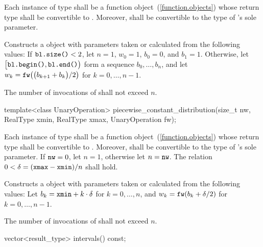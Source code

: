 \begin{itemdescr}
\pnum\requires
 Each instance of type 
 shall be a function object~(\ref{function.objects})
 whose return type shall be convertible to .
 Moreover,
  shall be convertible
 to the type of 's sole parameter.

\pnum\effects Constructs a  object
 with parameters taken or calculated
 from the following values:
 If $\texttt{bl.size()} < 2$,
 let $n = 1$,
     $ w_0 = 1 $,
     $ b_0 = 0 $,
 and $ b_1 = 1 $.
 Otherwise,
 let $\bigl[\texttt{bl.begin()}, \texttt{bl.end()}\bigr)$
 form a sequence $ b_0, \ldots, b_n $,
 and
 let $ w_k = \texttt{fw}\bigl(\bigl(b_{k+1} + b_k\bigr) / 2\bigr) $
 for $ k = 0, \ldots, n\!-\!1 $.

\pnum\complexity
 The number of invocations of  shall not exceed $n$.
\end{itemdescr}


%
\begin{itemdecl}
template<class UnaryOperation>
 piecewise_constant_distribution(size_t nw, RealType xmin, RealType xmax, UnaryOperation fw);
\end{itemdecl}

\begin{itemdescr}
\pnum\requires
 Each instance of type 
 shall be a function object~(\ref{function.objects})
 whose return type shall be convertible to .
 Moreover,
  shall be convertible
 to the type of 's sole parameter.
 If $ \texttt{nw} = 0 $, let $ n = 1 $, otherwise let $n = \texttt{nw}$.
 The relation $ 0 < \delta = (\texttt{xmax} - \texttt{xmin}) / n $
 shall hold.

\pnum\effects Constructs a  object
 with parameters taken or calculated
 from the following values:
 Let $ b_k = \texttt{xmin} + k \cdot \delta $ for $ k = 0, \ldots, n $,
 and $ w_k = \texttt{fw}(b_k + \delta / 2) $ for $ k = 0, \ldots, n\!-\!1 $.

\pnum\complexity
 The number of invocations of  shall not exceed $n$.
\end{itemdescr}

%
%
\begin{itemdecl}
vector<result_type> intervals() const;
\end{itemdecl}

